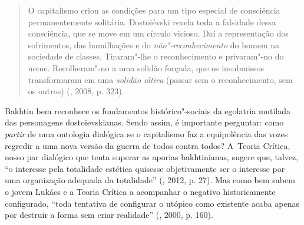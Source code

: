 \begin{quote}
O capitalismo criou as condições para um tipo especial de consciência
permanentemente solitária. Dostoiévski revela toda a falsidade dessa
consciência, que se move em um círculo vicioso. Daí a representação dos
sofrimentos, das humilhações e do \emph{não"-reconhecimento} do homem na
sociedade de classes. Tiraram"-lhe o reconhecimento e privaram"-no do
nome. Recolheram"-no a uma solidão forçada, que os insubmissos
transformaram em uma \emph{solidão altiva} (passar sem o reconhecimento,
sem os outros) (, 2008, p. 323).
\end{quote}

Bakhtin bem reconhece os fundamentos histórico"-sociais da egolatria
mutilada das personagens dostoievskianas. Sendo assim, é importante
perguntar: como \emph{partir} de uma ontologia dialógica se o
capitalismo faz a equipolência das vozes regredir a uma nova versão da
guerra de todos contra todos? A~Teoria Crítica, nosso par dialógico que
tenta superar as aporias bakhtinianas, sugere que, talvez, ``o interesse
pela totalidade estética quisesse objetivamente ser o interesse por uma
organização adequada da totalidade'' (, 2012, p. 27). Mas como bem
sabem o jovem Lukács e a Teoria Crítica a acompanhar o negativo
historicamente configurado, ``toda tentativa de configurar o utópico
como existente acaba apenas por destruir a forma sem criar realidade''
(, 2000, p. 160).

